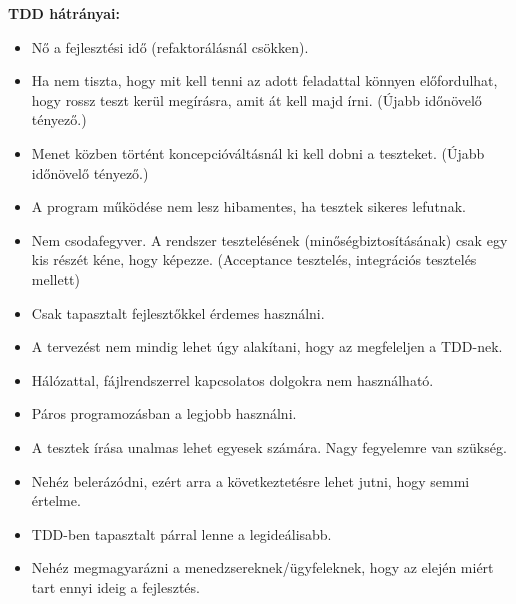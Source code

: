 \textbf{TDD hátrányai:}
\hfill\\
\begin{itemize}
\item Nő a fejlesztési idő (refaktorálásnál csökken).
\item Ha nem tiszta, hogy mit kell tenni az adott feladattal könnyen előfordulhat, hogy rossz teszt kerül megírásra, amit át kell majd írni. (Újabb időnövelő tényező.)
\item Menet közben történt koncepcióváltásnál ki kell dobni a teszteket. (Újabb időnövelő tényező.)
\item A program működése nem lesz hibamentes, ha tesztek sikeres lefutnak.
\item Nem csodafegyver. A rendszer tesztelésének (minőségbiztosításának) csak egy kis részét kéne, hogy képezze. (Acceptance tesztelés, integrációs tesztelés mellett)
\item Csak tapasztalt fejlesztőkkel érdemes használni.
\item A tervezést nem mindig lehet úgy alakítani, hogy az megfeleljen a TDD-nek.
\item Hálózattal, fájlrendszerrel kapcsolatos dolgokra nem használható.
\item Páros programozásban a legjobb használni.
\item A tesztek írása unalmas lehet egyesek számára. Nagy fegyelemre van szükség.
\item Nehéz belerázódni, ezért arra a következtetésre lehet jutni, hogy semmi értelme.
\item TDD-ben tapasztalt párral lenne a legideálisabb.
\item Nehéz megmagyarázni a menedzsereknek/ügyfeleknek, hogy az elején miért tart ennyi ideig a fejlesztés.
\end{itemize}



